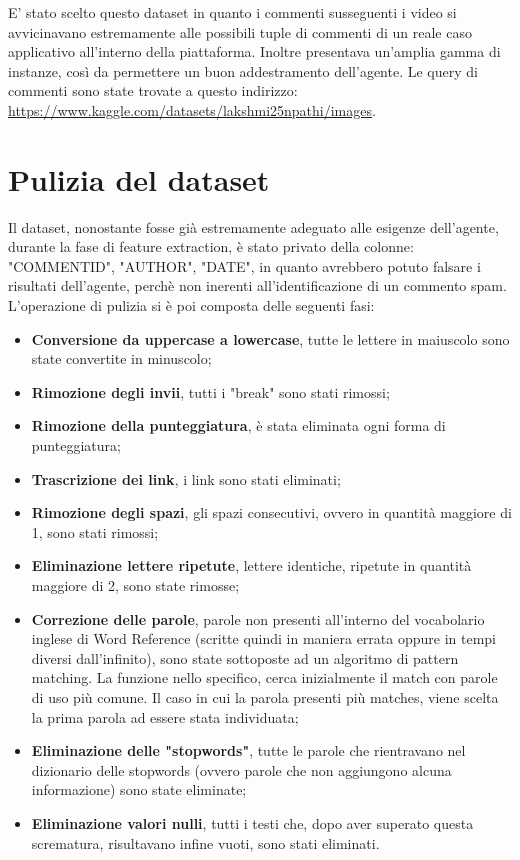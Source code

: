 \documentclass{report}
\begin{document}
    E' stato scelto questo dataset in quanto i commenti susseguenti i video si avvicinavano estremamente alle possibili tuple di commenti
    di un reale caso applicativo all'interno della piattaforma.
    Inoltre presentava un'amplia gamma di instanze, così da permettere un buon addestramento dell'agente.
    Le query di commenti sono state trovate a questo indirizzo: \newline 
    \href{https://www.kaggle.com/datasets/lakshmi25npathi/images}{https://www.kaggle.com/datasets/lakshmi25npathi/images}.
    
    \section{Pulizia del dataset}
    Il dataset, nonostante fosse già estremamente adeguato alle esigenze dell'agente, durante la fase di feature extraction, 
    è stato privato della colonne: "COMMENT\textunderscore ID", "AUTHOR", "DATE", in quanto avrebbero potuto falsare i risultati dell'agente, 
    perchè non inerenti all'identificazione di un commento spam.
    L'operazione di pulizia si è poi composta delle seguenti fasi: 

    \begin{itemize}
        \item {\bfseries Conversione da uppercase a lowercase}, tutte le lettere in maiuscolo sono state convertite in minuscolo;
        \item {\bfseries Rimozione degli invii}, tutti i "break" sono stati rimossi;
        \item {\bfseries Rimozione della punteggiatura}, è stata eliminata ogni forma di punteggiatura;
        \item {\bfseries Trascrizione dei link}, i link sono stati eliminati;
        \item {\bfseries Rimozione degli spazi}, gli spazi consecutivi, ovvero in  quantità maggiore di 1, sono stati rimossi;
        \item {\bfseries Eliminazione lettere ripetute}, lettere identiche, ripetute in quantità maggiore di 2, sono state rimosse;
        \item {\bfseries Correzione delle parole}, parole non presenti all'interno del vocabolario inglese di Word Reference (scritte quindi in maniera errata oppure in tempi diversi dall'infinito), sono state sottoposte 
        ad un algoritmo di pattern matching. La funzione nello specifico, cerca inizialmente il match con parole di uso più comune. Il caso in cui
        la parola presenti più matches, viene scelta la prima parola ad essere stata individuata;
        \item {\bfseries Eliminazione delle "stopwords"}, tutte le parole che rientravano nel dizionario delle stopwords (ovvero parole che non aggiungono alcuna informazione) 
        sono state eliminate;
        \item {\bfseries Eliminazione valori nulli}, tutti i testi che, dopo aver superato questa scrematura, risultavano infine vuoti, sono stati eliminati.

 
    \end{itemize}
    \newpage
    
\end{document}
